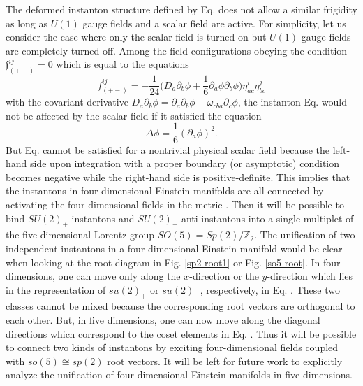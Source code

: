 \documentclass[12pt,epsf]{article}
\begin{document}
The deformed instanton structure defined by Eq.  does not allow a similar frigidity
as long as $U(1)$ gauge fields and a scalar field are active.
For simplicity, let us consider the case where only the scalar field is turned on but
$U(1)$ gauge fields are completely turned off.
Among the field configurations obeying the condition $\mathfrak{f}^{ij}_{(+-)} = 0$ which is equal
to the equations
\begin{equation}\label{mixed=0}
f^{ij}_{(+-)} = - \frac{1}{24} \Big( D_a \partial_b \phi + \frac{1}{6} \partial_a \phi \partial_b \phi \Big)
\eta^i_{ac} \bar{\eta}^j_{bc}
\end{equation}
with the covariant derivative $D_a \partial_b \phi = \partial_a \partial_b \phi - \omega_{cba} \partial_c \phi$,
the instanton Eq.  would not be affected by the scalar field if it satisfied
the equation
\begin{equation}\label{def-insens}
 \Delta \phi = \frac{1}{6} (\partial_a \phi)^2.
\end{equation}
But Eq.  cannot be satisfied for a nontrivial physical scalar field because
the left-hand side upon integration with a proper boundary (or asymptotic) condition
becomes negative while the right-hand side is positive-definite.
This implies that the instantons in four-dimensional Einstein manifolds are all connected by
activating the four-dimensional fields in the metric . Then it will be possible to bind
$SU(2)_+$ instantons and $SU(2)_-$ anti-instantons into a single multiplet of
the five-dimensional Lorentz group $SO(5) = Sp(2)/\mathbb{Z}_2$.
The unification of two independent instantons in a four-dimensional Einstein manifold would be clear
when looking at the root diagram in Fig. \ref{sp2-root1} or Fig. \ref{so5-root}.
In four dimensions, one can move only along the $x$-direction or the $y$-direction which
lies in the representation of $su(2)_+$ or $su(2)_-$, respectively, in Eq. .
These two classes cannot be mixed because the corresponding root vectors are orthogonal to each other.
But, in five dimensions, one can now move along the diagonal directions which correspond to the coset elements
in Eq. . Thus it will be possible to connect two kinds of instantons by exciting
four-dimensional fields coupled with $so(5) \cong sp(2)$ root vectors.
It will be left for future work to explicitly analyze the unification of four-dimensional Einstein manifolds
in five dimensions.
\end{document}
